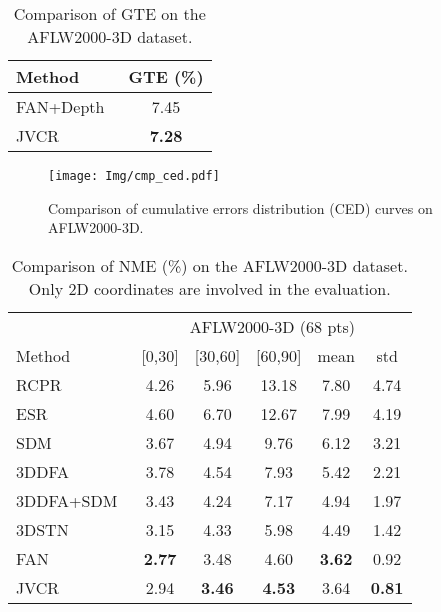 \documentclass[a4paper,conference]{IEEEtran}
\begin{document}
\begin{table}[b]
	\centering
	\caption{Comparison of GTE on the AFLW2000-3D dataset. }
	\begin{tabular}{lc}
		\toprule
		Method & GTE (\%) \\
		\midrule
		FAN+Depth~\cite{Bulat2017HowFar} & 7.45 \\
		\midrule
		JVCR  & \bf 7.28 \\
		\bottomrule
	\end{tabular}\label{tab:compAFLW3D}\end{table}



\begin{figure}[t]
	\begin{center}
		\texttt{[image: Img/cmp\_ced.pdf]}
		\caption{Comparison of cumulative errors distribution (CED) curves on AFLW2000-3D.
		}
		\label{fig:compCED}
	\end{center}
\end{figure}

\begin{table}[t]
	\centering
	\caption{Comparison of NME (\%) on the AFLW2000-3D dataset. Only 2D coordinates are involved in the evaluation.}
	\begin{tabular}{l|ccc|cc}
		\toprule
		& \multicolumn{5}{c}{AFLW2000-3D (68 pts)} \\
		\cmidrule{2-6}    Method & [0\degree,30\degree] & [30\degree,60\degree] & [60\degree,90\degree] & mean  & std \\
		\midrule
		RCPR~\cite{burgos2013robust}  & 4.26  & 5.96  & 13.18 & 7.80  & 4.74 \\
		ESR~\cite{cao2014face}   & 4.60  & 6.70  & 12.67 & 7.99  & 4.19 \\
		SDM~\cite{xiong2013supervised}   & 3.67  & 4.94  & 9.76  & 6.12  & 3.21 \\
		3DDFA~\cite{zhu2016face} & 3.78  & 4.54  & 7.93  & 5.42  & 2.21 \\
		3DDFA+SDM~\cite{zhu2016face} & 3.43  & 4.24  & 7.17  & 4.94  & 1.97 \\
		3DSTN~\cite{Bhagavatula2017Faster} & 3.15  & 4.33  & 5.98  & 4.49  & 1.42 \\
		FAN~\cite{Bulat2017HowFar} & \bf 2.77  & 3.48  & 4.60   & \bf 3.62  & 0.92 \\
\midrule
		JVCR  &  2.94  & \bf 3.46  & \bf 4.53  & 3.64  & \bf 0.81 \\
		\bottomrule
	\end{tabular}\label{tab:compAFLW2D}\end{table}
\end{document}
